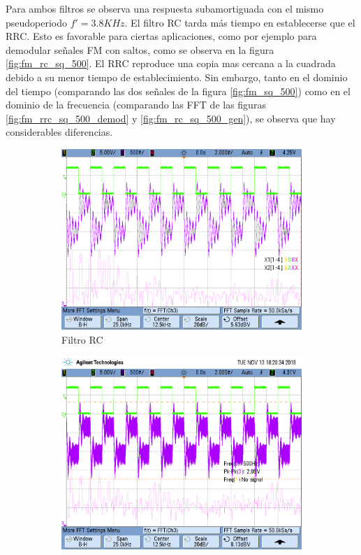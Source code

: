 \documentclass[../../tc_tp6_main.tex]{subfiles}
\begin{document}
Para ambos filtros se observa una respuesta subamortiguada con el mismo pseudoperiodo $f' = 3.8KHz$. El filtro RC tarda m\'as tiempo en establecerse que el RRC. Esto es favorable para ciertas aplicaciones, como por ejemplo para demodular se\~nales FM con saltos, como se observa en la figura \ref{fig:fm_rc_sq_500}. El RRC reproduce una copia mas cercana a la cuadrada debido a su menor tiempo de establecimiento. Sin embargo, tanto en el dominio del tiempo (comparando las dos se\~nales de la figura \ref{fig:fm_sq_500})  como en el dominio de la frecuencia (comparando las FFT de las figuras \ref{fig:fm_rrc_sq_500_demod} y \ref{fig:fm_rc_sq_500_gen}), se observa que hay considerables diferencias.


\begin{figure}[H]	%
	\centering
	\begin{subfigure}[t]{0.45\textwidth}
		\centering
		\includegraphics[width=\textwidth]{figures/fm_rc_sq_500_demod.png}
		\caption{Filtro RC}
		\label{fig:fm_rc_sq_500_demod_bis}
	\end{subfigure}%
	\hfill%
	\begin{subfigure}[t]{0.45\textwidth}
		\centering
		\includegraphics[width=\textwidth]{figures/fm_rrc_sq_500_demod.png}

\end{subfigure}
\end{figure}
\end{document}
